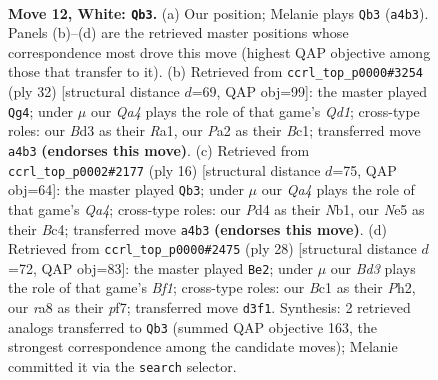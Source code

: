 \documentclass[11pt]{article}
\begin{document}
\clearpage

\begin{figure}[p]\centering
\begin{subfigure}{0.46\textwidth}\centering
\resizebox{\linewidth}{!}{%
\newchessgame
\chessboard[
  setfen={r1bk1b1r/ppq2ppp/2p1p3/3nN3/Q2P4/3BP3/PP3PPP/R1B1K2R w KQ - 4 12},
  showmover=false,
  pgfstyle=straightmove, color=movearrow, markmove={a4-b3}
]}
\caption{}
\end{subfigure}\hfill
\begin{subfigure}{0.46\textwidth}\centering
\resizebox{\linewidth}{!}{%
\newchessgame
\chessboard[
  setfen={r1bqk2r/1p2bppp/4p3/2npP1N1/p7/P6P/1PB2PP1/R1BQR1K1 w kq - 6 17},
  showmover=false,
  pgfstyle=straightmove, color=movearrow, markmove={d1-g4}
]}
\caption{}
\end{subfigure}
\\[4pt]
\begin{subfigure}{0.46\textwidth}\centering
\resizebox{\linewidth}{!}{%
\newchessgame
\chessboard[
  setfen={r1b1kb1r/pp1n1pp1/2p1pq1p/8/Q1BPP3/5N2/PP3PPP/RN2K2R w KQkq - 0 9},
  showmover=false,
  pgfstyle=straightmove, color=movearrow, markmove={a4-b3}
]}
\caption{}
\end{subfigure}\hfill
\begin{subfigure}{0.46\textwidth}\centering
\resizebox{\linewidth}{!}{%
\newchessgame
\chessboard[
  setfen={r1b2rk1/2qp1ppp/p1n1p3/1p6/3P1NQ1/2P5/PP3PPP/R3KB1R w KQ - 1 15},
  showmover=false,
  pgfstyle=straightmove, color=movearrow, markmove={f1-e2}
]}
\caption{}
\end{subfigure}
\caption{\textbf{Move 12, White: \texttt{Qb3}.} (a) Our position; Melanie plays \texttt{Qb3} (\texttt{a4b3}). Panels (b)--(d) are the retrieved master positions whose correspondence most drove this move (highest QAP objective among those that transfer to it). (b) Retrieved from \texttt{ccrl\_top\_p0000\#3254} (ply 32) [structural distance $d$=69, QAP obj=99]: the master played \texttt{Qg4}; under $\mu$ our \emph{Qa4} plays the role of that game's \emph{Qd1}; cross-type roles: our \emph{B}d3 as their \emph{R}a1, our \emph{P}a2 as their \emph{B}c1; transferred move \texttt{a4b3} \textbf{(endorses this move)}. (c) Retrieved from \texttt{ccrl\_top\_p0002\#2177} (ply 16) [structural distance $d$=75, QAP obj=64]: the master played \texttt{Qb3}; under $\mu$ our \emph{Qa4} plays the role of that game's \emph{Qa4}; cross-type roles: our \emph{P}d4 as their \emph{N}b1, our \emph{N}e5 as their \emph{B}c4; transferred move \texttt{a4b3} \textbf{(endorses this move)}. (d) Retrieved from \texttt{ccrl\_top\_p0000\#2475} (ply 28) [structural distance $d$=72, QAP obj=83]: the master played \texttt{Be2}; under $\mu$ our \emph{Bd3} plays the role of that game's \emph{Bf1}; cross-type roles: our \emph{B}c1 as their \emph{P}h2, our \emph{r}a8 as their \emph{p}f7; transferred move \texttt{d3f1}. Synthesis: 2 retrieved analogs transferred to \texttt{Qb3} (summed QAP objective 163, the strongest correspondence among the candidate moves); Melanie committed it via the \texttt{search} selector.}
\label{fig:thought-m22}
\end{figure}
\end{document}
